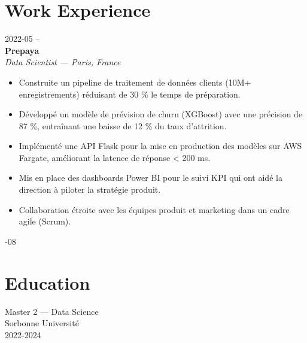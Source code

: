 \documentclass[10pt,letterpaper]{article}
\begin{document}
\begin{paracol}{2}
\begin{rightcolumn}
\section*{Work Experience}

\begin{tcolorbox}
  \begin{minipage}[t]{0.48\linewidth}
    2022-05 --\\
    \textbf{Prepaya}\\
    \textit{Data Scientist — Paris, France}
    \begin{itemize}
      \item Construite un pipeline de traitement de données clients (10M+ enregistrements) réduisant de 30 \% le temps de préparation.
      \item Développé un modèle de prévision de churn (XGBoost) avec une précision de 87 \%, entraînant une baisse de 12 \% du taux d’attrition.
      \item Implémenté une API Flask pour la mise en production des modèles sur AWS Fargate, améliorant la latence de réponse \textless{} 200 ms.
      \item Mis en place des dashboards Power BI pour le suivi KPI qui ont aidé la direction à piloter la stratégie produit.
      \item Collaboration étroite avec les équipes produit et marketing dans un cadre agile (Scrum).
    \end{itemize}
  \end{minipage}\hfill
  \begin{minipage}[t]{0.48\linewidth}
    -08
  \end{minipage}
\end{tcolorbox}

\vspace{0.9in}

\section*{Education}
\begin{tcolorbox}[colback=white,boxrule=1pt,colframe=primary]
  \begin{minipage}{0.47\linewidth}
    Master 2 — Data Science\\
    Sorbonne Université\\
    2022-2024
  \end{minipage}
\end{tcolorbox}


\end{rightcolumn}
\end{paracol}
\end{document}

